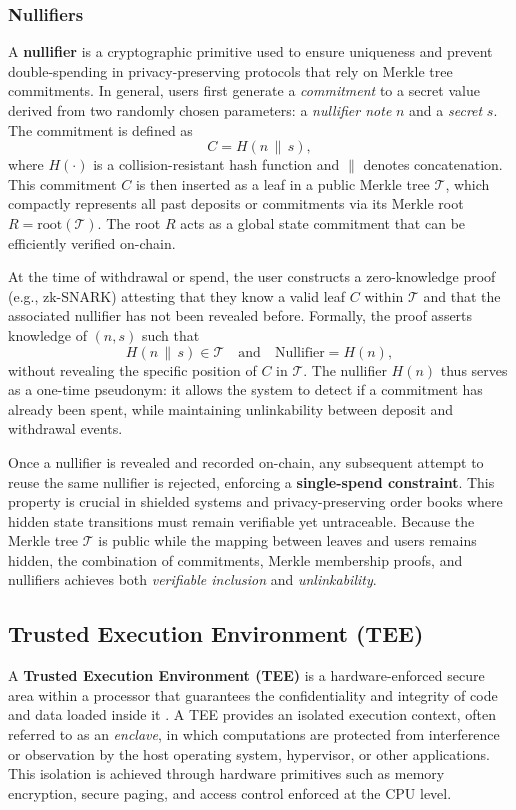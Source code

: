 \documentclass[12pt,a4paper]{article}
\begin{document}
\subsubsection{Nullifiers}

A \textbf{nullifier} is a cryptographic primitive used to ensure uniqueness and prevent double-spending in privacy-preserving protocols that rely on Merkle tree commitments.  
In general, users first generate a \textit{commitment} to a secret value derived from two randomly chosen parameters: a \textit{nullifier note} $n$ and a \textit{secret} $s$.  
The commitment is defined as
$$
C = H(n \, \| \, s),
$$
where $H(\cdot)$ is a collision-resistant hash function and $\|$ denotes concatenation.  
This commitment $C$ is then inserted as a leaf in a public Merkle tree $\mathcal{T}$, which compactly represents all past deposits or commitments via its Merkle root $R = \text{root}(\mathcal{T})$.  
The root $R$ acts as a global state commitment that can be efficiently verified on-chain.

At the time of withdrawal or spend, the user constructs a zero-knowledge proof (e.g., zk-SNARK) attesting that they know a valid leaf $C$ within $\mathcal{T}$ and that the associated nullifier has not been revealed before.  
Formally, the proof asserts knowledge of $(n, s)$ such that
$$
H(n \, \| \, s) \in \mathcal{T}
\quad \text{and} \quad
\text{Nullifier} = H(n),
$$
without revealing the specific position of $C$ in $\mathcal{T}$.  
The nullifier $H(n)$ thus serves as a one-time pseudonym: it allows the system to detect if a commitment has already been spent, while maintaining unlinkability between deposit and withdrawal events.

Once a nullifier is revealed and recorded on-chain, any subsequent attempt to reuse the same nullifier is rejected, enforcing a \textbf{single-spend constraint}.  
This property is crucial in shielded systems and privacy-preserving order books where hidden state transitions must remain verifiable yet untraceable.  
Because the Merkle tree $\mathcal{T}$ is public while the mapping between leaves and users remains hidden, the combination of commitments, Merkle membership proofs, and nullifiers achieves both \textit{verifiable inclusion} and \textit{unlinkability}.  

\subsection{Trusted Execution Environment (TEE)}

A \textbf{Trusted Execution Environment (TEE)} is a hardware-enforced secure area within a processor that guarantees the confidentiality and integrity of code and data loaded inside it \parencite{sabt2015trusted}.  
A TEE provides an isolated execution context, often referred to as an \textit{enclave}, in which computations are protected from interference or observation by the host operating system, hypervisor, or other applications.   This isolation is achieved through hardware primitives such as memory encryption, secure paging, and access control enforced at the CPU level.  
\end{document}
